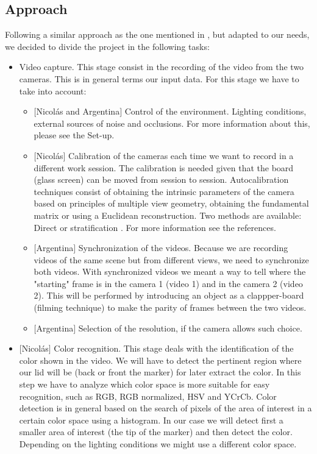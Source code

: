 \documentclass[a4paper,12pt]{article}
\begin{document}
\subsection*{Approach}
Following a similar approach as the one mentioned in \cite{conci}, but adapted to our needs, we decided to divide the project in the following tasks:
\begin{itemize}
    \item Video capture. This stage consist in the recording of the video from the two cameras. This is in general terms our input data. For this stage we have to take into account:
    \begin{itemize}
        \item $[$Nicolás and Argentina$]$ Control of the environment. Lighting conditions, external sources of noise and occlusions. For more information about this, please see the Set-up.
        \item $[$Nicolás$]$ Calibration of the cameras each time we want to record in a different work session. The calibration is needed given that the board (glass screen) can be moved from session to session. Autocalibration techniques consist of obtaining the intrinsic parameters of the camera based on principles of multiple view geometry, obtaining the fundamental matrix or using a Euclidean reconstruction. Two methods are available: Direct \cite{mendoncca} or stratification \cite{faugeras}. For more information see the references.
        \item $[$Argentina$]$ Synchronization of the videos. Because we are recording videos of the same scene but from different views, we need to synchronize both videos. With synchronized videos we meant a way to tell where the "starting" frame is in the camera 1 (video 1) and in the camera 2 (video 2). This will be performed by introducing an object as a clappper-board (filming technique) to make the parity of frames between the two videos.
        \item $[$Argentina$]$ Selection of the resolution, if the camera allows such choice.
    \end{itemize}
    \item $[$Nicolás$]$ Color recognition. This stage deals with the identification of the color shown in the video. We will have to detect the pertinent region where our lid will be (back or front the marker) for later extract the color. In this step we have to analyze which color space is more suitable for easy recognition, such as RGB, RGB normalized, HSV and YCrCb. Color detection is in general based on the search of pixels of the area of interest in a certain color space using a histogram. In our case we will detect first a smaller area of interest (the tip of the marker) and then detect the color. Depending on the lighting conditions we might use a different color space.

\end{itemize}
\end{document}
